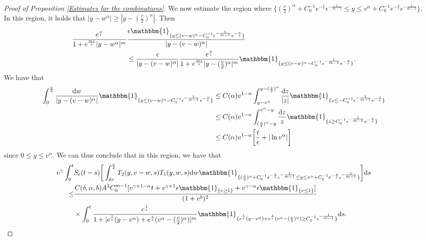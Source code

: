 \documentclass[11pt]{article}
\numberwithin{equation}{section}
\newcommand{\der}{\textup{d}}
\begin{document}
\begin{proof}[Proof of Proposition \ref{Estimates for the combinations}]
We now estimate the region where $\{(\frac{v}{2})^{\alpha}+C_{0}^{-1}e^{-\frac{s}{\epsilon}}\epsilon^{-\frac{1}{m-1}}\leq y\leq v^{\alpha}+C_{0}^{-1}e^{-\frac{s}{\epsilon}}\epsilon^{-\frac{1}{m-1}}\}$. In this region, it holds that $|y-w^{\alpha}|\geq |y-(\frac{v}{2})^{\alpha}|$. Then 
\begin{align*}
  \frac{e^{\frac{s}{\epsilon}}}{1+e^{\frac{ms}{\epsilon}}|y-w^{\alpha}|^{m}}&\frac{\epsilon\mathbbm{1}_{\{y\leq (v-w)^{\alpha}-C_{0}^{-1}\epsilon^{-\frac{1}{m-1}}e^{-\frac{s}{\epsilon}}\}}}{|y-(v-w)^{\alpha}|}\\
   &\leq  \frac{\epsilon}{|y-(v-w)^{\alpha}|}  \frac{e^{\frac{s}{\epsilon}}}{1+e^{\frac{ms}{\epsilon}}|y-(\frac{v}{2})^{\alpha}|^{m}}\mathbbm{1}_{\{y\leq (v-w)^{\alpha}-C_{0}^{-1}\epsilon^{-\frac{1}{m-1}}e^{-\frac{s}{\epsilon}}\}}.
\end{align*}
We have that
\begin{align}\label{log growth}
    \int_{0}^{\frac{v}{2}} \frac{\der w}{|y-(v-w)^{\alpha}|} \mathbbm{1}_{\{y\leq (v-w)^{\alpha}-C_{0}^{-1}\epsilon^{-\frac{1}{m-1}}e^{-\frac{s}{\epsilon}}\}}&\leq  C(\alpha)v^{1-\alpha} \int_{y-v^{\alpha}}^{y-(\frac{v}{2})^{\alpha}} \frac{\der z}{|z|} \mathbbm{1}_{\{z\leq -C_{0}^{-1}\epsilon^{-\frac{1}{m-1}}e^{-\frac{s}{\epsilon}}\}}\nonumber\\
    &\leq C(\alpha)v^{1-\alpha} \int_{(\frac{v}{2})^{\alpha}-y}^{v^{\alpha}-y}\frac{\der z}{z} \mathbbm{1}_{\{z\geq C_{0}^{-1}\epsilon^{-\frac{1}{m-1}}e^{-\frac{s}{\epsilon}}\}}\nonumber\\
    &\leq C(\alpha)v^{1-\alpha}\bigg[\frac{t}{\epsilon}+|\ln{v^{\alpha}}|\bigg]
\end{align}
since $0\leq y\leq v^{\alpha}$. We can thus conclude that in this region, we have that 
\begin{align*}
      v^{\gamma}\int_{0}^{t}& S_{\epsilon}(t-s)\bigg[\int_{\delta v}^{\frac{v}{2}} T_{2}(y,v-w,s)T_{1}(y,w,s)\der w\mathbbm{1}_{\{(\frac{v}{2})^{\alpha}+C_{0}^{-1}e^{-\frac{s}{\epsilon}}\epsilon^{-\frac{1}{m-1}}\leq y\leq v^{\alpha}+C_{0}^{-1}e^{-\frac{s}{\epsilon}}\epsilon^{-\frac{1}{m-1}}\}}\bigg]\der s\\
      \leq &\frac{C(\delta,\alpha,b)A^{3}C_{0}^{m-1} [v^{\gamma+1-\alpha}t+v^{\gamma+1}\epsilon\mathbbm{1}_{\{v\geq 1\}} +v^{\gamma-\alpha}\epsilon\mathbbm{1}_{\{v\leq 1\}} ]}{(1+v^{b})^{2}}\\
      &\times \int_{0}^{t}\frac{e^{\frac{t}{\epsilon}}}{1+|e^{\frac{t}{\epsilon}}(y-v^{\alpha})+e^{\frac{s}{\epsilon}}(v^{\alpha}-(\frac{v}{2})^{\alpha})|^{m}} \mathbbm{1}_{\{e^{\frac{t}{\epsilon}}(y-v^{\alpha})+e^{\frac{s}{\epsilon}}(v^{\alpha}-(\frac{v}{2})^{\alpha})\geq C_{0}^{-1}\epsilon^{-\frac{1}{m-1}} \}}\der s.

\end{align*}
\end{proof}
\end{document}
